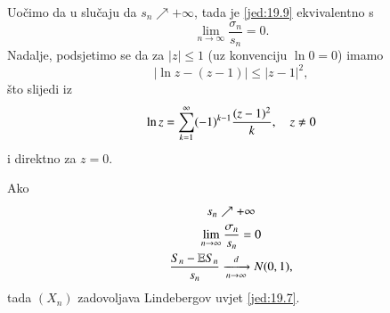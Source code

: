 Uo\v cimo da u slu\v caju da $s_n \nearrow +\infty$, tada je \eqref{jed:19.9} ekvivalentno s
\begin{equation}    \label{jed:19.10}
    \lim\limits_{n \to \infty} \frac{\sigma_n}{s_n} = 0.
\end{equation}
Nadalje, podsjetimo se da za $|z| \leq 1$ (uz konvenciju $\ln 0 = 0$) imamo
\begin{equation}    \label{jed:19.11}
    | \ln z - (z - 1) | \leq |z - 1|^2,
\end{equation}
\v sto slijedi iz
\begin{equation*}
    \ln z = \sum\limits_{k = 1}^{\infty} (-1)^{k-1} \frac{(z - 1)^2}{k}, \quad z \neq 0
\end{equation*}
i direktno za $z = 0$.

\begin{tm}  \label{tm:19.12}
    Ako
    \begin{equation*}
        \begin{gathered}
            s_n \nearrow +\infty\\
            \lim\limits_{n \to \infty} \frac{\sigma_n}{s_n} = 0\\
            \frac{S_n - \mathbb{E} S_n}{s_n} \xrightarrow[n \to \infty]{d} N(0,1),
        \end{gathered}
    \end{equation*}
    tada $(X_n)$ zadovoljava Lindebergov uvjet \eqref{jed:19.7}.
\end{tm}

